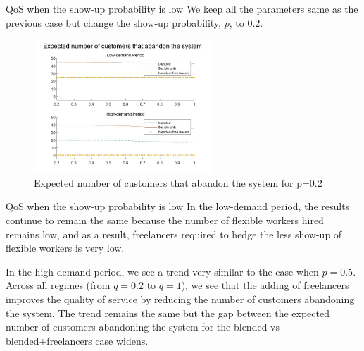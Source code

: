 \documentclass[8pt]{beamer}
\begin{document}
\begin{frame}{QoS when the show-up probability is low}
We keep all the parameters same as the previous case but change the show-up probability, $p$, to $0.2$. \\
\begin{figure}[hbt!]
\includegraphics[height=5cm]{p0.2.jpg}
\caption{Expected number of customers that abandon the system for p=0.2}
\end{figure}
\end{frame}
\begin{frame}{QoS when the show-up probability is low}
In the low-demand period, the results continue to remain the same because the number of flexible workers hired remains low, and as a result, freelancers required to hedge the less show-up of flexible workers is very low.\bigskip

In the high-demand period, we see a trend very similar to the case when $p=0.5$. Across all regimes (from $q=0.2$ to $q=1$), we see that the adding of freelancers improves the quality of service by reducing the number of customers abandoning the system. The trend remains the same but the gap between the expected number of customers abandoning the system for the blended vs blended+freelancers case widens.
\end{frame}
  
\end{document}
